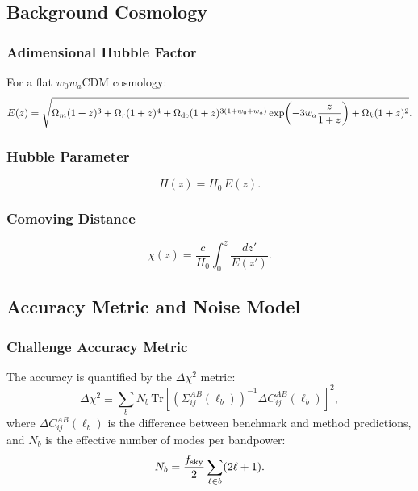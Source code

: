 \subsection{Background Cosmology}

\subsubsection{Adimensional Hubble Factor}

For a flat $w_0 w_a$CDM cosmology:
\begin{equation}
    E(z) = \sqrt{
        \Omega_m(1+z)^3
        + \Omega_r(1+z)^4
        + \Omega_{\rm de}(1+z)^{3(1+w_0+w_a)}\exp\!\left(-3w_a\frac{z}{1+z}\right)
        + \Omega_k(1+z)^2
    }.
    \label{eq:Ez}
\end{equation}

\subsubsection{Hubble Parameter}
\begin{equation}
    H(z) = H_0\,E(z).
\end{equation}

\subsubsection{Comoving Distance}
\begin{equation}
    \chi(z) = \frac{c}{H_0}\int_0^z \frac{dz'}{E(z')}.
\end{equation}

\subsection{Accuracy Metric and Noise Model}

\subsubsection{Challenge Accuracy Metric}

The accuracy is quantified by the $\Delta\chi^2$ metric:
\begin{equation}
    \Delta\chi^2 \equiv \sum_b N_b\,
    \mathrm{Tr}\!\left[
        \left(\Sigma^{AB}_{ij}(\ell_b)\right)^{-1}
        \Delta C^{AB}_{ij}(\ell_b)
    \right]^2,
    \label{eq:delta_chi2}
\end{equation}
where $\Delta C^{AB}_{ij}(\ell_b)$ is the difference between benchmark and
method predictions, and $N_b$ is the effective number of modes per bandpower:
\begin{equation}
    N_b = \frac{f_{\rm sky}}{2}\sum_{\ell \in b}(2\ell+1).
    \label{eq:Nb}
\end{equation}

